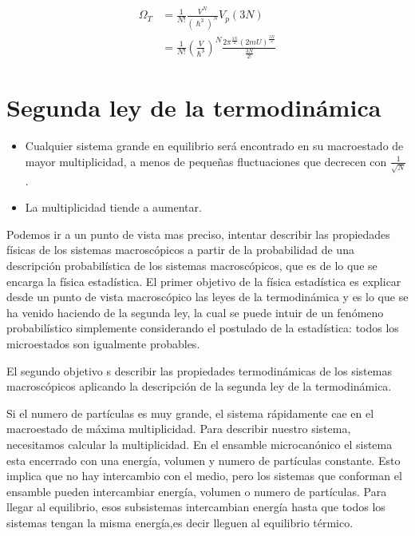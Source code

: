 \documentclass[11pt,fleqn]{book}
\begin{document}
\begin{example}
\begin{equation}\begin{split}
      \Omega_{T}&=\frac{1}{N!}\frac{V^{N}}{(\hslash^{3})^{N}}V_{p}(3N)\\
    &=\frac{1}{N !}\left(\frac{V}{\hslash^{3}}\right)^{N} \frac{2 \pi^{\frac{3 N}{2}}(2 m U)^{\frac{3N }{2}}}{\frac{3 N}{2 !}}  
\end{split}
    \label{Eq. 3.12}
\end{equation}
\end{example}

\section{Segunda ley de la termodinámica }

\begin{itemize}
    \item Cualquier sistema grande en equilibrio será encontrado en su macroestado de mayor multiplicidad, a menos de pequeñas fluctuaciones que decrecen con $\frac{1}{\sqrt{N}}$.
    \item La multiplicidad tiende a aumentar.
\end{itemize}

Podemos ir a un punto de vista mas preciso, intentar describir las propiedades físicas de los sistemas  macroscópicos a partir de la probabilidad de una descripción probabilística de los sistemas macroscópicos, que es de lo que se encarga la física estadística. El primer objetivo de la física estadística es explicar desde un punto de vista macroscópico las leyes de la termodinámica y es lo que se ha venido haciendo de la segunda ley, la cual se puede intuir de un fenómeno probabilístico simplemente considerando el postulado de la estadística: todos los microestados son igualmente probables. 

El segundo objetivo s describir las propiedades termodinámicas de los sistemas macroscópicos aplicando la descripción de la segunda ley de la termodinámica. 

Si el numero de partículas es muy grande, el sistema rápidamente cae en el macroestado de máxima multiplicidad. Para describir nuestro sistema, necesitamos calcular la multiplicidad. En el ensamble microcanónico el sistema esta encerrado con una energía, volumen y numero de partículas constante. Esto implica que no hay intercambio con el medio, pero los sistemas que conforman el ensamble pueden intercambiar energía, volumen o numero de partículas. Para llegar al equilibrio, esos subsistemas intercambian energía hasta que todos los sistemas tengan la misma energía,es decir lleguen al equilibrio térmico.
\end{document}
